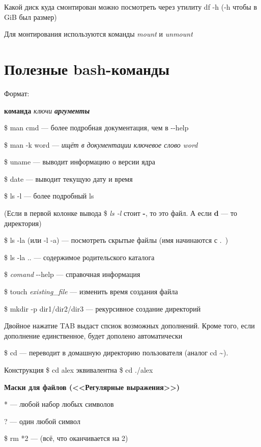 \documentclass[oneside, final, 14pt]{extreport} %
\begin{document}
Какой диск куда смонтирован можно посмотреть через утилиту df -h (-h чтобы в GiB был размер)

Для монтирования используются команды \textit{mount} и \textit{unmount}



\section{Полезные bash-команды}

Формат:

\textbf{команда} \textit{ключи} \textbf{\textit{аргументы}}

\vspace{\baselineskip}

\$ man cmd --- более подробная документация, чем в \--\--help

\$ man -k word –– \textit{ищёт в документации ключевое слово word}

\$ uname --- выводит информацию о версии ядра

\$ date --- выводит текущую дату и время

\$ ls -l --- более подробный ls

(Если в первой колонке вывода \$ \textit{ls -l} стоит \textbf{-}, то это файл. А если \textbf{d} --- то директория)

\$ ls -la (или -l -a) --- посмотреть скрытые файлы (имя начинаются с .~)

\$ ls -la .. --- содержимое родительского каталога

\$ \textit{comand} \--\--help --- справочная информация

\$ touch \textit{existing\_file} --- изменить время создания файла

\$ mkdir -p dir1/dir2/dir3 --- рекурсивное создание директорий

Двойное нажатие TAB выдаст спсиок возможных дополнений. Кроме того, если дополнение единственное, 
будет дополено автоматически

\$ cd --- переводит в домашную директорию пользователя (аналог cd \textasciitilde).

Конструкция \$ cd alex эквивалентна \$ cd ./alex

\vspace{\baselineskip}
\textbf{Маски для файлов (<<Регулярные выражения>>)}

* --- любой набор любых символов

? --- один любой символ

\$ rm *2 --- (всё, что оканчивается на 2)
\end{document}
